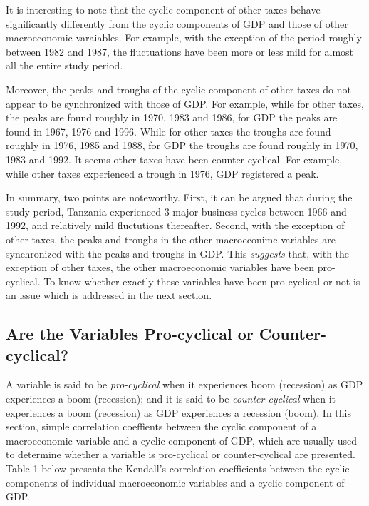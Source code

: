 \documentclass[12pt,a4paper,final]{article}
\begin{document}
It is interesting to note that the cyclic component of other taxes behave significantly differently from the cyclic components of GDP and those of other macroeconomic varaiables. For example, with the exception of the period roughly between 1982 and 1987, the fluctuations have been more or less mild for almost all the entire study period. 

Moreover, the peaks and troughs of the cyclic component of other taxes do not appear to be synchronized with those of GDP. For example, while for other taxes, the peaks are found roughly in 1970, 1983 and 1986, for GDP the peaks are found in 1967, 1976 and 1996. While for other taxes the troughs are found roughly in 1976, 1985 and 1988, for GDP the troughs are found roughly in 1970, 1983 and 1992.  It seems other taxes have been counter-cyclical. For example, while other taxes experienced a trough in 1976, GDP registered a peak. 

In summary, two points are noteworthy. First, it can be argued that during the study period, Tanzania experienced 3 major business cycles between 1966 and 1992, and relatively mild fluctutions thereafter. Second, with the exception of other taxes, the peaks and troughs in the other macroeconimc variables are synchronized with the peaks and troughs in GDP. This \textit{suggests} that, with the exception of other taxes, the other macroeconomic variables have been pro-cyclical.  To know whether exactly these variables have been pro-cyclical or not is an issue which is addressed in the next section.


\subsection{Are the Variables Pro-cyclical or Counter-cyclical?}

A variable is said to be \textit{pro-cyclical} when it experiences boom (recession) as GDP experiences a boom (recession); and it is said to be \textit{counter-cyclical} when it experiences a boom (recession) as GDP experiences a recession (boom). In this section, simple correlation coeffients between the cyclic component of a macroeconomic variable and a cyclic component of GDP, which are usually used to determine whether a variable is pro-cyclical or counter-cyclical are presented.  Table 1 below presents the Kendall's correlation coefficients between the cyclic components of individual macroeconomic variables and a cyclic component of GDP.
\end{document}
